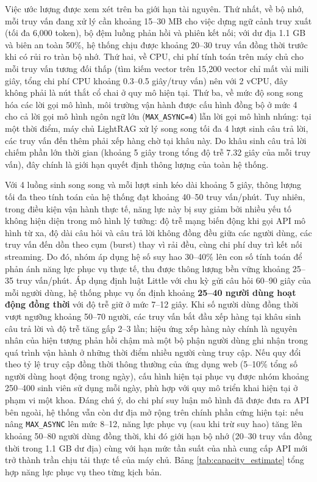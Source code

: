 Việc ước lượng được xem xét trên ba giới hạn tài nguyên. Thứ nhất, về bộ nhớ, mỗi truy vấn đang xử lý cần khoảng 15--30 MB cho việc dựng ngữ cảnh truy xuất (tối đa 6,000 token), bộ đệm luồng phản hồi và phiên kết nối; với dư địa 1.1 GB và biên an toàn 50\%, hệ thống chịu được khoảng 20--30 truy vấn đồng thời trước khi có rủi ro tràn bộ nhớ. Thứ hai, về CPU, chi phí tính toán trên máy chủ cho mỗi truy vấn tương đối thấp (tìm kiếm vector trên 15,200 vector chỉ mất vài mili giây, tổng chi phí CPU khoảng 0.3--0.5 giây/truy vấn) nên với 2 vCPU, đây không phải là nút thắt cổ chai ở quy mô hiện tại. Thứ ba, về mức độ song song hóa các lời gọi mô hình, môi trường vận hành được cấu hình đồng bộ ở mức 4 cho cả lời gọi mô hình ngôn ngữ lớn (\texttt{MAX\_ASYNC=4}) lẫn lời gọi mô hình nhúng: tại một thời điểm, máy chủ LightRAG xử lý song song tối đa 4 lượt sinh câu trả lời, các truy vấn đến thêm phải xếp hàng chờ tại khâu này. Do khâu sinh câu trả lời chiếm phần lớn thời gian (khoảng 5 giây trong tổng độ trễ 7.32 giây của mỗi truy vấn), đây chính là giới hạn quyết định thông lượng của toàn hệ thống.

Với 4 luồng sinh song song và mỗi lượt sinh kéo dài khoảng 5 giây, thông lượng tối đa theo tính toán của hệ thống đạt khoảng 40--50 truy vấn/phút. Tuy nhiên, trong điều kiện vận hành thực tế, năng lực này bị suy giảm bởi nhiều yếu tố không hiện diện trong mô hình lý tưởng: độ trễ mạng biến động khi gọi API mô hình từ xa, độ dài câu hỏi và câu trả lời không đồng đều giữa các người dùng, các truy vấn đến dồn theo cụm (burst) thay vì rải đều, cùng chi phí duy trì kết nối streaming. Do đó, nhóm áp dụng hệ số suy hao 30--40\% lên con số tính toán để phản ánh năng lực phục vụ thực tế, thu được thông lượng bền vững khoảng 25--35 truy vấn/phút. Áp dụng định luật Little với chu kỳ gửi câu hỏi 60--90 giây của mỗi người dùng, hệ thống phục vụ ổn định khoảng \textbf{25--40 người dùng hoạt động đồng thời} với độ trễ giữ ở mức 7--12 giây. Khi số người dùng đồng thời vượt ngưỡng khoảng 50--70 người, các truy vấn bắt đầu xếp hàng tại khâu sinh câu trả lời và độ trễ tăng gấp 2--3 lần; hiệu ứng xếp hàng này chính là nguyên nhân của hiện tượng phản hồi chậm mà một bộ phận người dùng ghi nhận trong quá trình vận hành ở những thời điểm nhiều người cùng truy cập. Nếu quy đổi theo tỷ lệ truy cập đồng thời thông thường của ứng dụng web (5--10\% tổng số người dùng hoạt động trong ngày), cấu hình hiện tại phục vụ được nhóm khoảng 250--400 sinh viên sử dụng mỗi ngày, phù hợp với quy mô triển khai hiện tại ở phạm vi một khoa. Đáng chú ý, do chi phí suy luận mô hình đã được đưa ra API bên ngoài, hệ thống vẫn còn dư địa mở rộng trên chính phần cứng hiện tại: nếu nâng \texttt{MAX\_ASYNC} lên mức 8--12, năng lực phục vụ (sau khi trừ suy hao) tăng lên khoảng 50--80 người dùng đồng thời, khi đó giới hạn bộ nhớ (20--30 truy vấn đồng thời trong 1.1 GB dư địa) cùng với hạn mức tần suất của nhà cung cấp API mới trở thành trần chịu tải thực tế của máy chủ. Bảng \ref{tab:capacity_estimate} tổng hợp năng lực phục vụ theo từng kịch bản.

